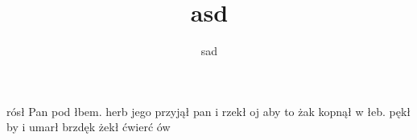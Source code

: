 \documentclass[12pt,a4paper]{book}
\author{sad
}
\title{asd
}
\begin{document}
\maketitle
rósł Pan pod łbem.
herb jego przyjął pan i rzekł oj aby to żak kopnął w łeb. pękł by i umarł brzdęk żekł ćwierć ów\\
\end{document}
